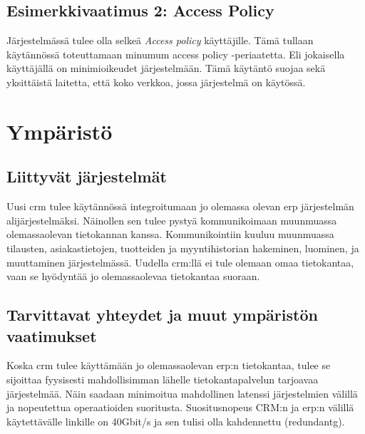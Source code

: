     \subsection{Esimerkkivaatimus 2: Access Policy}
        Järjestelmässä tulee olla selkeä \textit{Access policy} käyttäjille. Tämä tullaan käytännössä toteuttamaan
        minumum access policy -periaatetta. Eli jokaisella käyttäjällä on minimioikeudet järjestelmään.
        Tämä käytäntö suojaa sekä yksittäistä laitetta, että koko verkkoa, jossa järjestelmä on käytössä. 
        





\section{Ympäristö}     %
    \subsection{Liittyvät järjestelmät}     %
        Uusi \gls{crm} tulee käytännössä integroitumaan jo olemassa olevan \gls{erp} järjestelmän alijärjestelmäksi. Näinollen sen tulee pystyä kommunikoimaan muunmuassa olemassaolevan tietokannan kanssa. Kommunikointiin kuuluu muunmuassa tilausten, asiakastietojen, tuotteiden ja myyntihistorian hakeminen, luominen, ja muuttaminen järjestelmässä. Uudella \gls{crm}:llä ei tule olemaan omaa tietokantaa, vaan se hyödyntää jo olemassaolevaa tietokantaa suoraan. 


    \subsection{Tarvittavat yhteydet ja muut ympäristön vaatimukset}  %
        Koska \gls{crm} tulee käyttämään jo olemassaolevan \gls{erp}:n tietokantaa, tulee se sijoittaa fyysisesti mahdollisimman lähelle tietokantapalvelun tarjoavaa järjestelmää. Näin saadaan minimoitua mahdollinen latenssi järjestelmien välillä ja nopeutettua operaatioiden suoritusta. Suositusnopeus \gls{CRM}:n ja \gls{erp}:n välillä käytettävälle linkille on 40Gbit/s ja sen tulisi olla kahdennettu (\gls{redundantg}). 

